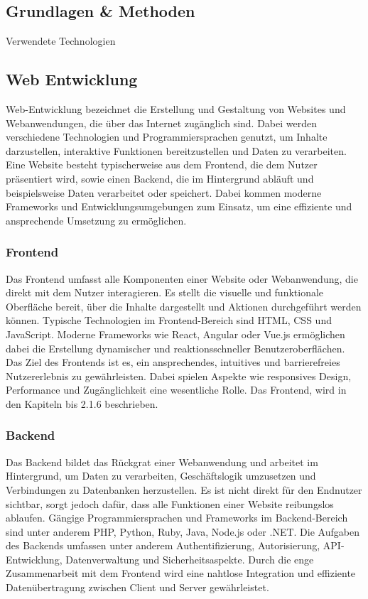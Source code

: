 \begin{inhalt}
\chapter{Grundlagen \& Methoden}
\renewcommand*\chapterpagestyle{scrheadings}

Verwendete Technologien 
\section{Web Entwicklung}

Web-Entwicklung \cite{WebEntwicklungWiki} bezeichnet die Erstellung und Gestaltung von Websites und Webanwendungen, die über das Internet zugänglich sind. Dabei werden verschiedene Technologien und Programmiersprachen genutzt, um Inhalte darzustellen, interaktive Funktionen bereitzustellen und Daten zu verarbeiten. Eine Website besteht typischerweise aus dem Frontend, die dem Nutzer präsentiert wird, sowie einen Backend, die im Hintergrund abläuft und beispielsweise Daten verarbeitet oder speichert. Dabei kommen moderne Frameworks und Entwicklungsumgebungen zum Einsatz, um eine effiziente und ansprechende Umsetzung zu ermöglichen. 

\subsection{Frontend} 

Das Frontend \cite{WebEntwicklungFrontendWiki} umfasst alle Komponenten einer Website oder Webanwendung, die direkt mit dem Nutzer interagieren. Es stellt die visuelle und funktionale Oberfläche bereit, über die Inhalte dargestellt und Aktionen durchgeführt werden können. Typische Technologien im Frontend-Bereich sind HTML, CSS und JavaScript. Moderne Frameworks wie React, Angular oder Vue.js ermöglichen dabei die Erstellung dynamischer und reaktionsschneller Benutzeroberflächen. Das Ziel des Frontends ist es, ein ansprechendes, intuitives und barrierefreies Nutzererlebnis zu gewährleisten. Dabei spielen Aspekte wie responsives Design, Performance und Zugänglichkeit eine wesentliche Rolle. Das Frontend, wird in den Kapiteln bis 2.1.6 beschrieben. 

\subsection{Backend}

Das Backend \cite{WebEntwicklungFrontendBackendWiki} bildet das Rückgrat einer Webanwendung und arbeitet im Hintergrund, um Daten zu verarbeiten, Geschäftslogik umzusetzen und Verbindungen zu Datenbanken herzustellen. Es ist nicht direkt für den Endnutzer sichtbar, sorgt jedoch dafür, dass alle Funktionen einer Website reibungslos ablaufen. Gängige Programmiersprachen und Frameworks im Backend-Bereich sind unter anderem PHP, Python, Ruby, Java, Node.js oder .NET. Die Aufgaben des Backends umfassen unter anderem Authentifizierung, Autorisierung, API-Entwicklung, Datenverwaltung und Sicherheitsaspekte. Durch die enge Zusammenarbeit mit dem Frontend wird eine nahtlose Integration und effiziente Datenübertragung zwischen Client und Server gewährleistet.


\end{inhalt}
